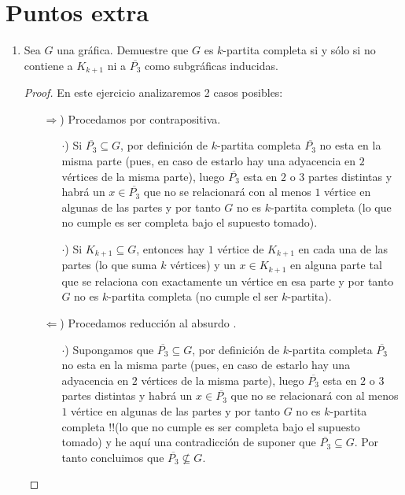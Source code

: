 \documentclass{article}
\begin{document}
  \section*{Puntos extra}

  \begin{enumerate}
    \item Sea $G$ una gr\'afica. Demuestre que $G$ es $k$-partita completa si y
      s\'olo si no contiene a $K_{k+1}$ ni a $\overline{P_3}$ como subgr\'aficas
      inducidas.

      \renewcommand\qedsymbol{QED}
      \begin{proof}
        En este ejercicio analizaremos 2 casos posibles:

        \begin{itemize}
        \item[$\Rightarrow$)] Procedamos por contrapositiva.

          \begin{itemize}
          \item[$\cdot$)] Si $\overline{P_3} \subseteq G$, por definición
            de $k$-partita completa $\overline{P_3}$ no esta en la misma
            parte (pues, en caso de estarlo hay una adyacencia en $2$ vértices
            de la misma parte), luego $\overline{P_3}$ esta en $2$ o $3$
            partes distintas y habrá un $x \in \overline{P_3}$ que no se
            relacionará con al menos $1$ vértice en algunas de las partes
            y por tanto $G$ no es $k$-partita completa (lo que no cumple es
            ser completa bajo el supuesto tomado).

          \item[$\cdot$)] Si $K_{k + 1} \subseteq G$, entonces hay $1$ vértice
            de $K_{k + 1}$ en cada una de las partes (lo que suma $k$ v\'ertices) y un
            $x \in K_{k + 1}$ en alguna parte tal que se relaciona con exactamente
            un v\'ertice en esa parte y por tanto $G$ no es $k$-partita completa
            (no cumple el ser $k$-partita).
          \end{itemize}
        \item[$\Leftarrow$)] Procedamos reducción al absurdo .

          \begin{itemize}
          \item[$\cdot$)] Supongamos que $\overline{P_3} \subseteq G$, por
            definición de $k$-partita completa $\overline{P_3}$ no esta en
            la misma parte (pues, en caso de estarlo hay una adyacencia en
            $2$ vértices de la misma parte), luego $\overline{P_3}$ esta en
            $2$ o $3$ partes distintas y habrá un $x \in \overline{P_3}$ que
            no se relacionará con al menos $1$ vértice en algunas de las partes
            y por tanto $G$ no es $k$-partita completa !!(lo que no cumple es
            ser completa bajo el supuesto tomado) y he aquí una contradicción
            de suponer que $\overline{P_3} \subseteq G$. Por tanto concluimos
            que $\overline{P_3} \nsubseteq G$.


\end{itemize}
\end{itemize}
\end{proof}
\end{enumerate}
\end{document}
